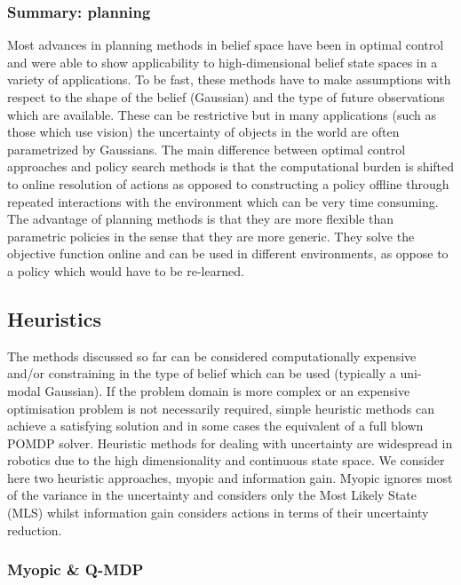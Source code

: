 \subsubsection{Summary: planning}
\sloppy
Most advances in planning methods in belief space have been in optimal control and were able to show 
applicability to high-dimensional belief state spaces in a variety of applications. To be fast, these methods have to make assumptions with respect to the shape of the belief (Gaussian) and the type of future observations which are available. These can 
be restrictive but in many applications (such as those which use vision) the uncertainty of objects in the world are 
often parametrized by Gaussians. The main difference between optimal control approaches and policy search 
methods is that the computational burden is shifted to online resolution of actions as opposed to constructing a policy offline through repeated 
interactions with the environment which can be very time consuming. The advantage of planning methods is that they 
are more flexible than parametric policies in the sense that they are more generic. They solve the objective function online and
can be used in different environments, as oppose to a policy which would have to be re-learned.

\subsection{Heuristics}\label{lit:heuristics}

The methods discussed so far can be considered computationally expensive and/or constraining in the type 
of belief which can be used (typically a uni-modal Gaussian). If the problem domain is more complex or 
an expensive optimisation problem is not necessarily required, simple heuristic methods can achieve a satisfying solution 
and in some cases the equivalent of a full blown POMDP solver. Heuristic methods for dealing with uncertainty are widespread in robotics
due to the high dimensionality and continuous state space. We consider here two heuristic approaches,
myopic and information gain. Myopic ignores most of the variance in the uncertainty and considers only the 
Most Likely State (MLS) whilst information gain considers actions in terms of their uncertainty reduction.

\subsubsection{Myopic \& Q-MDP}

